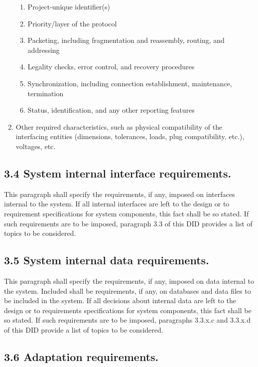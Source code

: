 \begin{enumerate}
  \begin{enumerate}
  \itemsep1pt\parskip0pt
  \item
    Project-unique identifier(s)
  \item
    Priority/layer of the protocol
  \item
    Packeting, including fragmentation and reassembly, routing, and
    addressing
  \item
    Legality checks, error control, and recovery procedures
  \item
    Synchronization, including connection establishment, maintenance,
    termination
  \item
    Status, identification, and any other reporting features
  \end{enumerate}
\item
  Other required characteristics, such as physical compatibility of the
  interfacing entities (dimensions, tolerances, loads, plug
  compatibility, etc.), voltages, etc.
\end{enumerate}

\subsection{3.4 System internal interface requirements.}

This paragraph shall specify the requirements, if any, imposed on
interfaces internal to the system. If all internal interfaces are left
to the design or to requirement specifications for system components,
this fact shall be so stated. If such requirements are to be imposed,
paragraph 3.3 of this DID provides a list of topics to be considered.

\subsection{3.5 System internal data requirements.}

This paragraph shall specify the requirements, if any, imposed on data
internal to the system. Included shall be requirements, if any, on
databases and data files to be included in the system. If all decisions
about internal data are left to the design or to requirements
specifications for system components, this fact shall be so stated. If
such requirements are to be imposed, paragraphs 3.3.x.c and 3.3.x.d of
this DID provide a list of topics to be considered.

\subsection{3.6 Adaptation requirements.}

